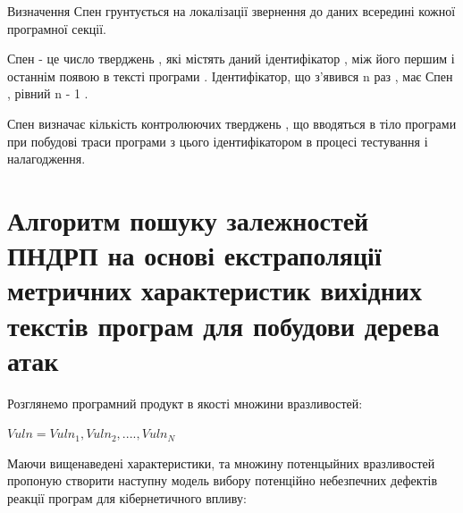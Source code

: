\documentclass[oneside,final,14pt]{extreport}
\begin{document}
Визначення Спен грунтується на локалізації звернення до даних всередині кожної програмної секції.

Спен - це число тверджень , які містять даний ідентифікатор , між його першим і останнім появою в тексті програми . Ідентифікатор, що з'явився n раз , має Спен , рівний n - 1 .

Спен визначає кількість контролюючих тверджень , що вводяться в тіло програми при побудові траси програми з цього ідентифікатором в процесі тестування і налагодження.


\section{Алгоритм пошуку залежностей ПНДРП на основі екстраполяції метричних характеристик вихідних текстів програм для побудови дерева атак}
\label{2section:id13}
Розглянемо програмний продукт в якості множини вразливостей:

$Vuln = {Vuln_1,Vuln_2,....,Vuln_N}$

Маючи вищенаведені характеристики, та множину потенцыйних вразливостей пропоную створити наступну модель вибору потенційно небезпечних дефектів реакції програм для кібернетичного впливу:
\end{document}
